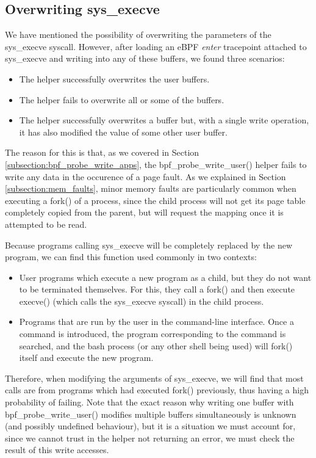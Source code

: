 \subsection{Overwriting sys\_execve} \label{subsection:sys_execve_writing}
We have mentioned the possibility of overwriting the parameters of the sys\_execve syscall. However, after loading an eBPF \textit{enter} tracepoint attached to sys\_execve and writing into any of these buffers, we found three scenarios:
\begin{itemize}
\item The helper successfully overwrites the user buffers.
\item The helper fails to overwrite all or some of the buffers.
\item The helper successfully overwrites a buffer but, with a single write operation, it has also modified the value of some other user buffer.
\end{itemize}

The reason for this is that, as we covered in Section \ref{subsection:bpf_probe_write_apps}, the bpf\_probe\_write\_user() helper fails to write any data in the occurence of a page fault. As we explained in Section \ref{subsection:mem_faults}, minor memory faults are particularly common when executing a fork() of a process, since the child process will not get its page table completely copied from the parent, but will request the mapping once it is attempted to be read.

Because programs calling sys\_execve will be completely replaced by the new program, we can find this function used commonly in two contexts:
\begin{itemize}
\item User programs which execute a new program as a child, but they do not want to be terminated themselves. For this, they call a fork() and then execute execve() (which calls the sys\_execve syscall) in the child process.
\item Programs that are run by the user in the command-line interface. Once a command is introduced, the program corresponding to the command is searched, and the bash process (or any other shell being used) will fork() itself and execute the new program.
\end{itemize}

Therefore, when modifying the arguments of sys\_execve, we will find that most calls are from programs which had executed fork() previously, thus having a high probability of failing. Note that the exact reason why writing one buffer with bpf\_probe\_write\_user() modifies multiple buffers simultaneously is unknown (and possibly undefined behaviour), but it is a situation we must account for, since we cannot trust in the helper not returning an error, we must check the result of this write accesses.

